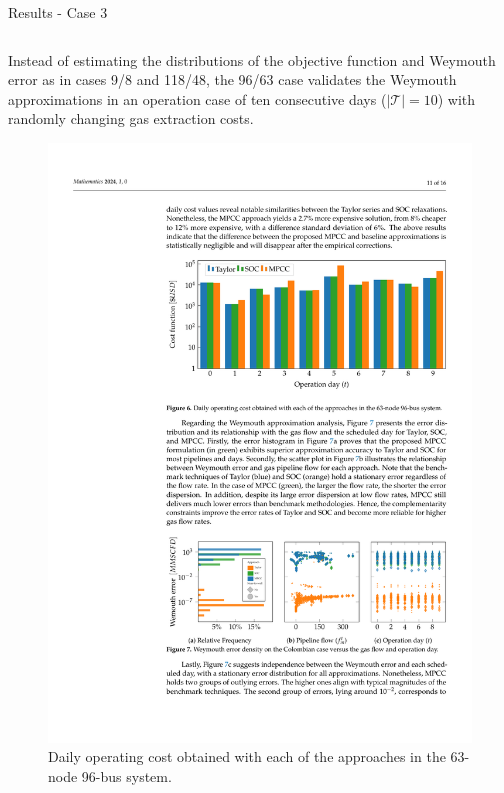 \documentclass[hyperref={colorlinks,citecolor=blue,linkcolor=blue,urlcolor=blue}]{beamer}
\newlength\figureheight
\newlength\figurewidth
\begin{document}
\begin{frame}{Results - Case 3}
\scriptsize
\begin{columns}[t,onlytextwidth]
    \begin{column}{0.48\textwidth}
        Instead of estimating the distributions of the objective function and Weymouth error as in cases 9/8 and 118/48, the 96/63 case validates the Weymouth approximations in an operation case of ten consecutive days ($\left | \mathcal{T} \right | = 10 $) with randomly changing gas extraction costs.
                
        \begin{figure}[H]
            \centering
            \setlength{}        
            \setlength{}
            \includegraphics[width=\figurewidth, height=\figureheight]{figures/case3_cost.pdf} 
            \caption{\scriptsize Daily operating cost obtained with each of the approaches in the 63-node 96-bus system.}
            \label{fig:red_test_cost}
        \end{figure}
    \end{column}
    

\end{columns}
\end{frame}
\end{document}
